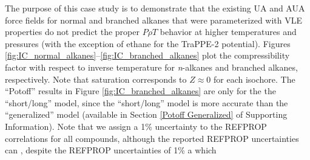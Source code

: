 \documentclass[preprint,letterpaper,floatfix,citeautoscript,aip,jcp]{revtex4-1}
\begin{document}
The purpose of this case study is to demonstrate that the existing UA and AUA force fields for normal and branched alkanes that were parameterized with VLE properties do not predict the proper $P \rho T$ behavior at higher temperatures and pressures (with the exception of ethane for the TraPPE-2 potential). Figures \ref{fig:IC_normal_alkanes}--\ref{fig:IC_branched_alkanes} plot the compressibility factor with respect to inverse temperature for \textit{n}-alkanes and branched alkanes, respectively. Note that saturation corresponds to $Z \approx 0$ for each isochore. The ``Potoff'' results in Figure \ref{fig:IC_branched_alkanes} are only for the the ``short/long'' model, since the ``short/long'' model is more accurate than the ``generalized'' model (available in Section \ref{Potoff Generalized} of Supporting Information). Note that we assign a 1\% uncertainty to the REFPROP correlations for all compounds, although the reported REFPROP uncertainties can , despite the REFPROP uncertainties of 1\% a which  




\end{document}
